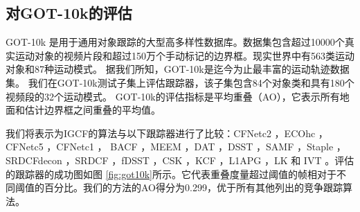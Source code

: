 \subsection{对GOT-10k的评估}
GOT-10k \cite{GOT-10k} 是用于通用对象跟踪的大型高多样性数据库。数据集包含超过10000个真实运动对象的视频片段和超过150万个手动标记的边界框。现实世界中有563类运动对象和87种运动模式。
据我们所知，GOT-10k是迄今为止最丰富的运动轨迹数据集。
我们在GOT-10k测试子集上评估跟踪器，该子集包含84个对象类和具有180个视频段的32个运动模式。
GOT-10k的评估指标是平均重叠（AO），它表示所有地面和估计边界框之间重叠的平均值。

我们将表示为IGCF的算法与以下跟踪器进行了比较：CFNetc2 \cite{Valmadre2017EndtoEndRL}，ECOhc \cite{Danelljan2017ECOEC}，CFNetc5 \cite{Valmadre2017EndtoEndRL}，CFNetc1 \cite{Valmadre2017EndtoEndRL}， BACF \cite{Galoogahi2017LearningBC}，MEEM \cite{Zhang2014MEEMRT}，DAT \cite{Possegger2015InDO}，DSST \cite{Danelljan2014AccurateSE}，SAMF \cite{Li2014ASA}，Staple \cite{Bertinetto2016StapleC}，SRDCFdecon \cite{Danelljan2016AdaptiveDO}，SRDCF \cite{Danelljan2015LearningSR}，fDSST \cite{Danelljan2017DiscriminativeSS}，CSK \cite{Henriques2012ExploitingTC}，KCF \cite{henriques2014high-speed}，L1APG \cite{Bao2012RealTR}，LK \cite{Shi1994GoodFT} 和 IVT \cite{Ross2007IncrementalLF}。评估的跟踪器的成功图如图 \ref{fig:got10k}所示。它代表重叠度量超过阈值的帧相对于不同阈值的百分比。我们的方法的AO得分为0.299，优于所有其他列出的竞争跟踪算法。

